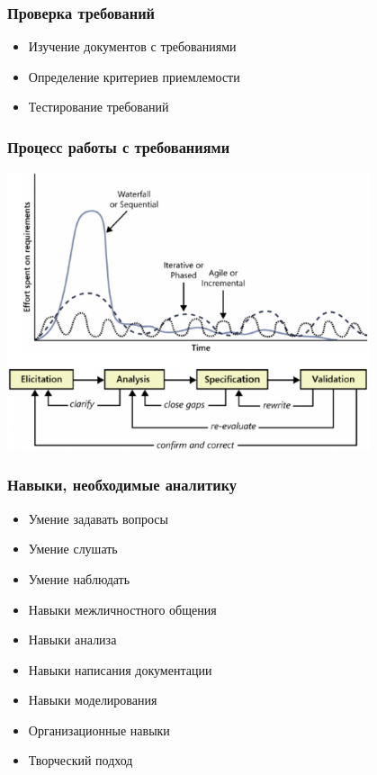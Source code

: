 \documentclass{../../slides-style}
\begin{document}
    \begin{frame}
        \frametitle{Проверка требований}
        \begin{itemize}
            \item Изучение документов с требованиями
            \item Определение критериев приемлемости
            \item Тестирование требований
        \end{itemize}
    \end{frame}

    \begin{frame}
        \frametitle{Процесс работы с требованиями}
        \begin{center}
            \includegraphics[width=0.8\textwidth]{requirementsProcess2.png}
        \end{center}
    \end{frame}

    \begin{frame}
        \frametitle{Навыки, необходимые аналитику}
        \begin{itemize}
            \item Умение задавать вопросы
            \item Умение слушать
            \item Умение наблюдать
            \item Навыки межличностного общения
            \item Навыки анализа
            \item Навыки написания документации
            \item Навыки моделирования
            \item Организационные навыки
            \item Творческий подход
        \end{itemize}
    \end{frame}
\end{document}
